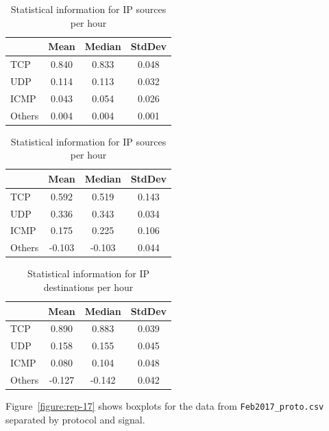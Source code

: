 \documentclass{article}
\begin{document}
\begin{table}[H]
    \parbox{.45\linewidth}{
        \centering
        \begin{tabular}{l|ccc}
                & Mean  & Median & StdDev \\
                   \hline
            TCP    & 0.840 & 0.833  & 0.048 \\
            UDP    & 0.114 & 0.113  & 0.032 \\
            ICMP   & 0.043 & 0.054  & 0.026 \\
            Others & 0.004 & 0.004  & 0.001 \\
        \end{tabular}
        \caption{\label{table:rep-17-packets} Statistical information for Packets per hour}
    }
    \parbox{.1\linewidth}{}
    \parbox{.45\linewidth}{
        \centering
        \begin{tabular}{l|ccc}
                   & Mean  & Median & StdDev \\
                   \hline
            TCP    &   0.592 & 0.519  & 0.143  \\
            UDP    &   0.336 & 0.343  & 0.034  \\
            ICMP   &   0.175 & 0.225  & 0.106  \\
            Others &  -0.103 & -0.103 & 0.044  \\
        \end{tabular}
        \caption{\label{table:rep-17-ips} Statistical information for IP sources per hour}
    }
\end{table}

\begin{table}[H]
    \centering
    \begin{tabular}{l|ccc}
               & Mean  & Median & StdDev \\
               \hline
        TCP    &  0.890 & 0.883&  0.039   \\
        UDP    &  0.158 & 0.155&  0.045   \\
        ICMP   &  0.080 & 0.104&  0.048   \\
        Others &  -0.127&  -0.142&  0.042 \\
    \end{tabular}
    \caption{\label{table:rep-17-ipd} Statistical information for IP destinations per hour}
\end{table}

Figure~\ref{figure:rep-17} shows
boxplots for the data from \texttt{Feb2017\_proto.csv} separated by protocol and signal.
\end{document}
